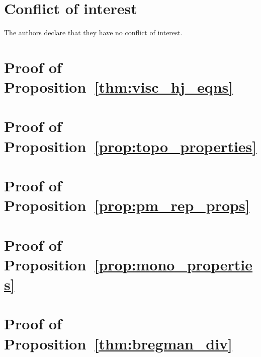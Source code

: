 \documentclass[smallcondensed]{svjour3}
\numberwithin{prop}{section}
\numberwithin{lem}{section}
\numberwithin{rem}{section}
\numberwithin{cor}{section}
\numberwithin{thm}{section}
\theoremstyle{plain}
\begin{document}
\section*{Conflict of interest}
The authors declare that they have no conflict of interest.

\appendix

\section{Proof of Proposition~\ref{thm:visc_hj_eqns}} \label{app:A}


\section{Proof of Proposition~\ref{prop:topo_properties}} \label{app:topo}


\section{Proof of Proposition~\ref{prop:pm_rep_props}} \label{app:rep}


\section{Proof of Proposition~\ref{prop:mono_properties}} \label{app:mono}


\section{Proof of Proposition~\ref{thm:bregman_div}}
\label{app:breg}




\end{document}
